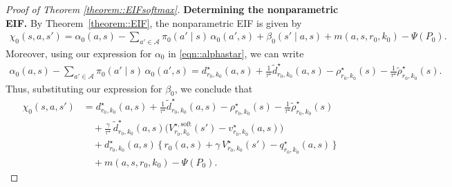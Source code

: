 \documentclass[11pt]{article}
\theoremstyle{plain}
\begin{document}
\begin{proof}[Proof of Theorem \ref{theorem::EIFsoftmax}]
\noindent \textbf{Determining the nonparametric EIF.}
By Theorem~\ref{theorem::EIF}, the nonparametric EIF is given by
\begin{align*}
   \chi_0(s,a,s') = \alpha_0(a,s) - \sum_{a'\in\mathcal{A}} \pi_{0}(a'\mid s)\,\alpha_0(a',s)  + \beta_0(s'\mid a,s) + m(a,s,r_0,k_0) - \Psi(P_0).
\end{align*}
Moreover, using our expression for $\alpha_0$ in \eqref{eqn::alphastar}, we can write
\begin{align*}
 \alpha_0(a,s) - \sum_{a'\in\mathcal{A}} \pi_0(a'\mid s)\,\alpha_0(a',s) 
=d_{r_0,k_0}^\star(a,s)
+\frac{1}{\tau^\star}\widetilde d_{r_0,k_0}^\star(a,s)
-\rho_{r_0,k_0}^\star(s)
-\frac{1}{\tau^\star}\widetilde\rho_{r_0,k_0}^\star(s).
\end{align*}
Thus, substituting our expression for $\beta_0$, we conclude that
\begin{align*}
   \chi_0(s,a,s') &= d_{r_0,k_0}^\star(a,s)
   +\frac{1}{\tau^\star}\widetilde d_{r_0,k_0}^\star(a,s)
   -\rho_{r_0,k_0}^\star(s)
   -\frac{1}{\tau^\star}\widetilde\rho_{r_0,k_0}^\star(s) \\
   &\quad + \frac{\gamma}{\tau^\star}\,\widetilde{d}_{r_0,k_0}^\star(a,s)\Big(V_{r_0,k_0}^{\star,\mathrm{soft}}(s')-v_{r_0,k_0}^\star(a,s)\Big) \\
   &\quad + d_{r_0,k_0}^\star(a,s)\,\Big\{\,r_0(a,s) + \gamma\,V_{r_0,k_0}^{\star}(s') - q_{r_0,k_0}^\star(a,s)\,\Big\}\\
   &\quad + m(a,s, r_0, k_0) - \Psi(P_0).
\end{align*}


 
 

\end{proof}
\end{document}
